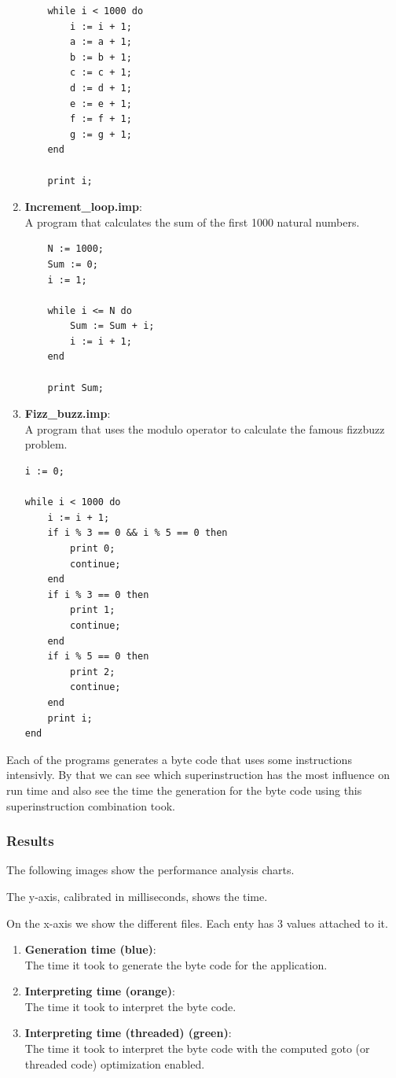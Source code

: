 \documentclass{article}
\begin{document}
\begin{enumerate}
\begin{verbatim}
    while i < 1000 do
        i := i + 1;
        a := a + 1;
        b := b + 1;
        c := c + 1;
        d := d + 1;
        e := e + 1;
        f := f + 1;
        g := g + 1;
    end

    print i;
\end{verbatim}

    \item \textbf{Increment\_loop.imp}:\\
    \label{item:inc_loop}
    A program that calculates the sum of the first 1000 natural numbers.
\begin{verbatim}
    N := 1000;
    Sum := 0;
    i := 1;

    while i <= N do
        Sum := Sum + i;
        i := i + 1;
    end

    print Sum;
\end{verbatim}
    \item \textbf{Fizz\_buzz.imp}:\\
    A program that uses the modulo operator to calculate the famous fizzbuzz problem.
\begin{verbatim}
i := 0;

while i < 1000 do
    i := i + 1;
    if i % 3 == 0 && i % 5 == 0 then
        print 0;
        continue;
    end
    if i % 3 == 0 then
        print 1;
        continue;
    end
    if i % 5 == 0 then
        print 2;
        continue;
    end
    print i;
end
\end{verbatim}
\end{enumerate}

Each of the programs generates a byte code that uses some instructions
intensivly. By that we can see which superinstruction has the most influence on
run time and also see the time the generation for the byte code using this
superinstruction combination took.

\subsubsection{Results}
The following images show the performance analysis charts.

The y-axis, calibrated in milliseconds, shows the time.

On the x-axis we show the different files. Each enty has 3 values attached to it.

\begin{enumerate}
    \item \textbf{Generation time (blue)}:\\
        The time it took to generate the byte code for the application.
    \item \textbf{Interpreting time (orange)}:\\
        The time it took to interpret the byte code.
    \item \textbf{Interpreting time (threaded) (green)}:\\
        The time it took to interpret the byte code with the computed goto (or
        threaded code) optimization enabled.
\end{enumerate}
\end{document}
